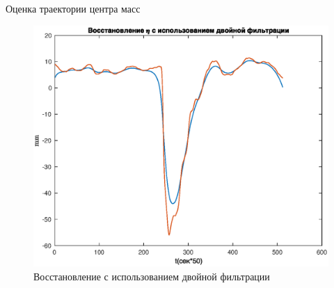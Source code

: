 \documentclass[10pt]{beamer}
\begin{document}





\begin{frame}{Оценка траектории центра масс}
		\begin{figure}[h!]
			\centering
			\includegraphics[width=0.8\linewidth]{restore_eta_double_real.eps}
			\caption{Восстановление с использованием двойной фильтрации}
			\label{restore_double_real}
		\end{figure}
\end{frame}
\end{document}
